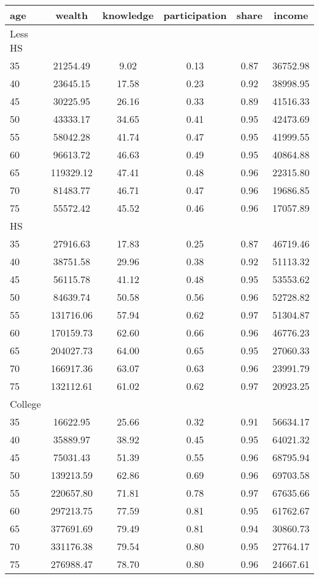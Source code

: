  \begin{tabular}{lccccc}
 \hline \hline
  age & wealth & knowledge & participation & share & income \\
 \hline
 Less HS & & & & & \\
 \hline
35 &  21254.49 &      9.02 &      0.13 &      0.87 &  36752.98 \\ 
40 &  23645.15 &     17.58 &      0.23 &      0.92 &  38998.95 \\ 
45 &  30225.95 &     26.16 &      0.33 &      0.89 &  41516.33 \\ 
50 &  43333.17 &     34.65 &      0.41 &      0.95 &  42473.69 \\ 
55 &  58042.28 &     41.74 &      0.47 &      0.95 &  41999.55 \\ 
60 &  96613.72 &     46.63 &      0.49 &      0.95 &  40864.88 \\ 
65 & 119329.12 &     47.41 &      0.48 &      0.96 &  22315.80 \\ 
70 &  81483.77 &     46.71 &      0.47 &      0.96 &  19686.85 \\ 
75 &  55572.42 &     45.52 &      0.46 &      0.96 &  17057.89 \\ 
 \hline
 HS & & & & & \\
 \hline
35 &  27916.63 &     17.83 &      0.25 &      0.87 &  46719.46 \\ 
40 &  38751.58 &     29.96 &      0.38 &      0.92 &  51113.32 \\ 
45 &  56115.78 &     41.12 &      0.48 &      0.95 &  53553.62 \\ 
50 &  84639.74 &     50.58 &      0.56 &      0.96 &  52728.82 \\ 
55 & 131716.06 &     57.94 &      0.62 &      0.97 &  51304.87 \\ 
60 & 170159.73 &     62.60 &      0.66 &      0.96 &  46776.23 \\ 
65 & 204027.73 &     64.00 &      0.65 &      0.95 &  27060.33 \\ 
70 & 166917.36 &     63.07 &      0.63 &      0.96 &  23991.79 \\ 
75 & 132112.61 &     61.02 &      0.62 &      0.97 &  20923.25 \\ 
 \hline
 College & & & & & \\
 \hline
35 &  16622.95 &     25.66 &      0.32 &      0.91 &  56634.17 \\ 
40 &  35889.97 &     38.92 &      0.45 &      0.95 &  64021.32 \\ 
45 &  75031.43 &     51.39 &      0.55 &      0.96 &  68795.94 \\ 
50 & 139213.59 &     62.86 &      0.69 &      0.96 &  69703.58 \\ 
55 & 220657.80 &     71.81 &      0.78 &      0.97 &  67635.66 \\ 
60 & 297213.75 &     77.59 &      0.81 &      0.95 &  61762.67 \\ 
65 & 377691.69 &     79.49 &      0.81 &      0.94 &  30860.73 \\ 
70 & 331176.38 &     79.54 &      0.80 &      0.95 &  27764.17 \\ 
75 & 276988.47 &     78.70 &      0.80 &      0.96 &  24667.61 \\ 
 \hline \hline
 \end{tabular}
